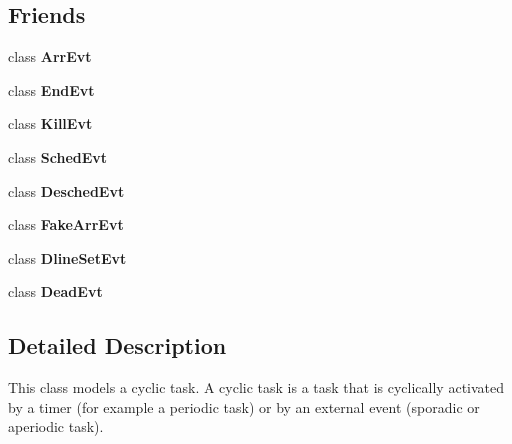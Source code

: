 \subsection*{Friends}
\begin{DoxyCompactItemize}
\item 
class {\bfseries Arr\+Evt}\hypertarget{classRTSim_1_1Task_a1ed299c7ff891fd374a8e1849880f795}{}\label{classRTSim_1_1Task_a1ed299c7ff891fd374a8e1849880f795}

\item 
class {\bfseries End\+Evt}\hypertarget{classRTSim_1_1Task_ae22d2595f36bcda7f3a5db79796b3714}{}\label{classRTSim_1_1Task_ae22d2595f36bcda7f3a5db79796b3714}

\item 
class {\bfseries Kill\+Evt}\hypertarget{classRTSim_1_1Task_a289e3eed6f45878659d5949af1277c62}{}\label{classRTSim_1_1Task_a289e3eed6f45878659d5949af1277c62}

\item 
class {\bfseries Sched\+Evt}\hypertarget{classRTSim_1_1Task_a15eb030d06ba48fb84706976f30018da}{}\label{classRTSim_1_1Task_a15eb030d06ba48fb84706976f30018da}

\item 
class {\bfseries Desched\+Evt}\hypertarget{classRTSim_1_1Task_a666ee5e2e66781b71061fa9160fee47f}{}\label{classRTSim_1_1Task_a666ee5e2e66781b71061fa9160fee47f}

\item 
class {\bfseries Fake\+Arr\+Evt}\hypertarget{classRTSim_1_1Task_a1e36dee6785de173baede195e3244dc6}{}\label{classRTSim_1_1Task_a1e36dee6785de173baede195e3244dc6}

\item 
class {\bfseries Dline\+Set\+Evt}\hypertarget{classRTSim_1_1Task_a325bd22e8a264067310b294544150f97}{}\label{classRTSim_1_1Task_a325bd22e8a264067310b294544150f97}

\item 
class {\bfseries Dead\+Evt}\hypertarget{classRTSim_1_1Task_ac042a2164b19585b820291848a8b6790}{}\label{classRTSim_1_1Task_ac042a2164b19585b820291848a8b6790}

\end{DoxyCompactItemize}


\subsection{Detailed Description}
This class models a cyclic task. A cyclic task is a task that is cyclically activated by a timer (for example a periodic task) or by an external event (sporadic or aperiodic task).

